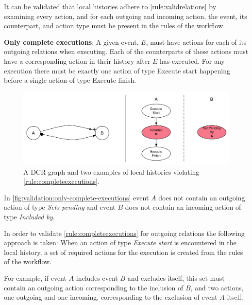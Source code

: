 	\noindent It can be validated that local histories adhere to \autoref{rule:validrelations} by examining every action, and for each outgoing and incoming action, the event, its counterpart, and action type must be present in the rules of the workflow.
	
	\begin{ruledef}
		\textbf{Only complete executions}: A given event, $E$, must have actions for each of its outgoing relations when executing. Each of the counterparts of these actions must have a corresponding action in their history after $E$ has executed. For any execution there must be exactly one action of type \textup{Execute start} happening before a single action of type \textup{Execute finish}.
		\label{rule:completeexecutions}
	\end{ruledef}

	\begin{figure}[H]
		\centering
		\includegraphics[width=\textwidth]{6validation/images/only-complete-executions.pdf}
		\caption{A DCR graph and two examples of local histories violating \autoref{rule:completeexecutions}.}
		\label{fig:validation:only-complete-executions}
	\end{figure}

	\noindent In \autoref{fig:validation:only-complete-executions} event $A$ does not contain an outgoing action of type \textit{Sets pending} and event $B$ does not contain an incoming action of type \textit{Included by}.

	\newpar In order to validate \autoref{rule:completeexecutions} for outgoing relations the following approach is taken: When an action of type \textit{Execute start} is encountered in the local history, a set of required actions for the execution is created from the rules of the workflow.
	
	For example, if event $A$ includes event $B$ and excludes itself, this set must contain an outgoing action corresponding to the inclusion of $B$, and two actions, one outgoing and one incoming, corresponding to the exclusion of event $A$ itself.
	
